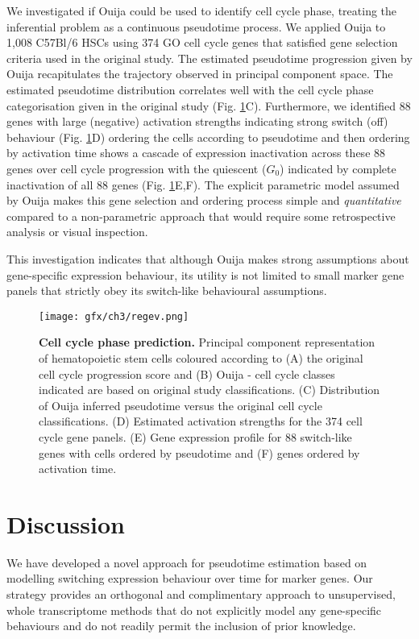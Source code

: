 We investigated if Ouija could be used to identify cell cycle phase, treating the inferential problem as a continuous pseudotime process. We applied Ouija to 1,008 C57Bl/6 HSCs using 374 GO cell cycle genes that satisfied gene selection criteria used in the original study. The estimated pseudotime progression given by Ouija recapitulates the  trajectory observed in principal component space. The estimated pseudotime distribution correlates well with the cell cycle phase categorisation  given in the original study (Fig. \ref{fig:regev}C). Furthermore, we identified 88 genes with large (negative) activation strengths indicating strong switch (off) behaviour (Fig. \ref{fig:regev}D) ordering the cells according to pseudotime and then ordering by activation time shows a cascade of expression inactivation across these 88 genes over cell cycle progression with the quiescent ($G_0$) indicated by complete inactivation of all 88 genes (Fig. \ref{fig:regev}E,F). The explicit parametric model assumed by Ouija makes this gene selection and ordering process simple and \emph{quantitative} compared to a non-parametric approach that would require some retrospective analysis or visual inspection.

This investigation indicates that although Ouija makes strong assumptions about gene-specific expression behaviour, its utility is not limited to small marker gene panels that strictly obey its switch-like behavioural assumptions.

\begin{figure}
	\texttt{[image: gfx/ch3/regev.png]}
	\caption{{\bf Cell cycle phase prediction.} Principal component representation of hematopoietic stem cells coloured according to (A) the original cell cycle progression score \cite{kowalczyk2015single} and (B) Ouija - cell cycle classes indicated are based on original study classifications. (C) Distribution of Ouija inferred pseudotime versus the original cell cycle classifications. (D) Estimated activation strengths for the 374 cell cycle gene panels. (E) Gene expression profile for 88 switch-like genes with cells ordered by pseudotime and (F) genes ordered by activation time.}
	\label{fig:regev}
\end{figure}




\section{Discussion}

We have developed a novel approach for pseudotime estimation based on modelling switching expression behaviour over time for marker genes. Our strategy provides an orthogonal and complimentary approach to unsupervised, whole transcriptome methods that do not explicitly model any gene-specific behaviours and do not readily permit the inclusion of prior knowledge.


